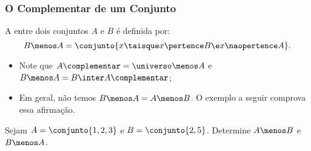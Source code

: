 \begin{frame}
	\frametitle{O Complementar de um Conjunto}

	\begin{definicao}[Diferença]
		A  entre dois conjuntos $A$ e $B$ é definida por:
		\[
			B \menos A = \conjunto { x \taisque x \pertence B \e x \naopertence A}.
		\]
	\end{definicao}\pause

	\begin{itemize}
		\item Note que $A\complementar = \universo \menos A$ e $B \menos A = B \inter A\complementar$;
		\item Em geral, não temos $B \menos A = A \menos B$. O exemplo a seguir comprova essa afirmação.
	\end{itemize}\pause

	\begin{exemplo}
		Sejam $A = \conjunto{1, 2, 3}$ e $B = \conjunto{2, 5}$. Determine $A \menos B$ e $B \menos A$.
	\end{exemplo}
\end{frame}